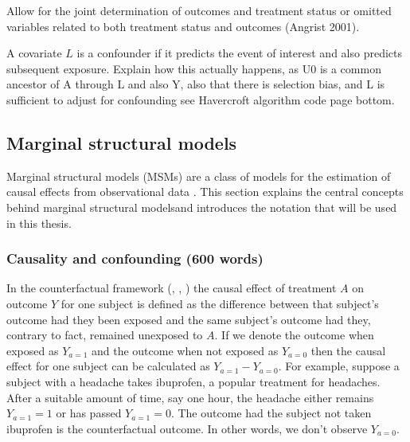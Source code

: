 \documentclass[11pt]{article}
\begin{document}
    Allow for the joint determination of outcomes and treatment status or
omitted variables related to both treatment status and outcomes (Angrist
2001).

A covariate \(L\) is a confounder if it predicts the event of interest
and also predicts subsequent exposure. Explain how this actually
happens, as U0 is a common ancestor of A through L and also Y, also that
there is selection bias, and L is sufficient to adjust for confounding
see Havercroft algorithm code page bottom.

    \subsection{Marginal structural
models}\label{marginal-structural-models}

Marginal structural models (MSMs) are a class of models for the
estimation of causal effects from observational data \citet{Robins2000}.
This section explains the central concepts behind marginal structural
modelsand introduces the notation that will be used in this thesis.

    \subsubsection{Causality and confounding (600
words)}\label{causality-and-confounding-600-words}

In the counterfactual framework (\citet{Neyman1923}, \citet{Rubin1978},
\citet{Robins1986}) the causal effect of treatment \(A\) on outcome
\(Y\) for one subject is defined as the difference between that
subject's outcome had they been exposed and the same subject's outcome
had they, contrary to fact, remained unexposed to \(A\). If we denote
the outcome when exposed as \(Y_{a=1}\) and the outcome when not exposed
as \(Y_{a=0}\) then the causal effect for one subject can be calculated
as \(Y_{a=1} - Y_{a=0}\). For example, suppose a subject with a headache
takes ibuprofen, a popular treatment for headaches. After a suitable
amount of time, say one hour, the headache either remains
\(Y_{a=1} = 1\) or has passed \(Y_{a=1} = 0\). The outcome had the
subject not taken ibuprofen is the counterfactual outcome. In other
words, we don't observe \(Y_{a=0}\). \linebreak
\end{document}
